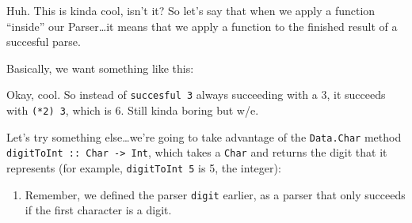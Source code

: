 \documentclass[]{article}
\newenvironment{Shaded}{}{}
\newcommand{\KeywordTok}[1]{\textcolor[rgb]{0.00,0.44,0.13}{\textbf{{#1}}}}
\newcommand{\DataTypeTok}[1]{\textcolor[rgb]{0.56,0.13,0.00}{{#1}}}
\newcommand{\DecValTok}[1]{\textcolor[rgb]{0.25,0.63,0.44}{{#1}}}
\newcommand{\StringTok}[1]{\textcolor[rgb]{0.25,0.44,0.63}{{#1}}}
\newcommand{\CommentTok}[1]{\textcolor[rgb]{0.38,0.63,0.69}{\textit{{#1}}}}
\newcommand{\OtherTok}[1]{\textcolor[rgb]{0.00,0.44,0.13}{{#1}}}
\newcommand{\FunctionTok}[1]{\textcolor[rgb]{0.02,0.16,0.49}{{#1}}}
\newcommand{\NormalTok}[1]{{#1}}
\begin{document}
Huh. This is kinda cool, isn't it? So let's say that when we apply a function ``inside'' our
Parser\ldots{}it means that we apply a function to the finished result of a succesful parse.

Basically, we want something like this:

\begin{Shaded}
\end{Shaded}

Okay, cool. So instead of \texttt{succesful\ 3} always succeeding with a 3, it succeeds with
\texttt{(*2)\ 3}, which is 6. Still kinda boring but w/e.

Let's try something else\ldots{}we're going to take advantage of the \texttt{Data.Char} method
\texttt{digitToInt\ ::\ Char\ -\textgreater{}\ Int}, which takes a \texttt{Char} and returns the
digit that it represents (for example, \texttt{digitToInt\ \textquotesingle{}5\textquotesingle{}} is
5, the integer):

\begin{Shaded}
\end{Shaded}

\begin{enumerate}
\def\labelenumi{\arabic{enumi}.}
\tightlist
\item
  Remember, we defined the parser \texttt{digit} earlier, as a parser that only succeeds if the
  first character is a digit.
\end{enumerate}
\end{document}
